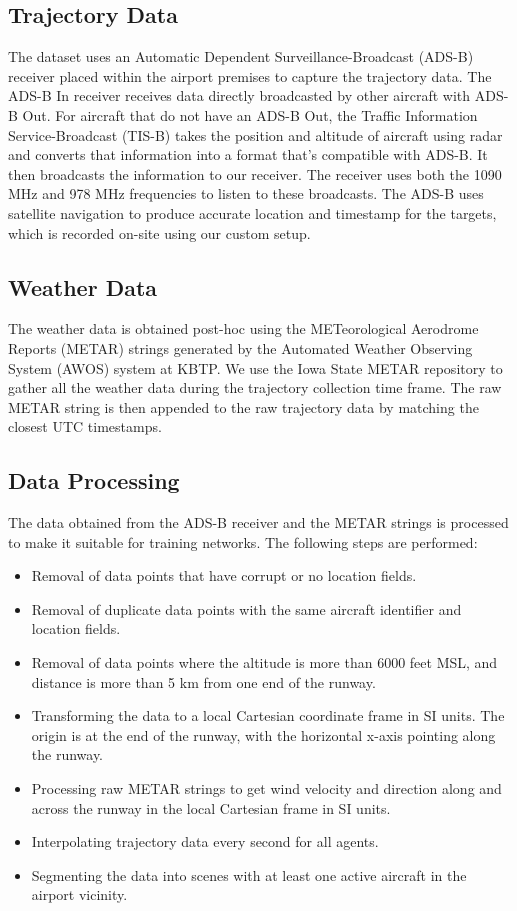 \documentclass[letterpaper, 10 pt, conference]{ieeeconf}
\begin{document}
\subsection{Trajectory Data}
The dataset uses an Automatic Dependent Surveillance-Broadcast (ADS-B) receiver \cite{dewsbury-2019} placed within the airport premises to capture the trajectory data. The ADS-B In receiver receives data directly broadcasted by other aircraft with ADS-B Out. For aircraft that do not have an ADS-B Out, the Traffic Information Service-Broadcast (TIS-B) takes the position and altitude of aircraft using radar and converts that information into a format that’s compatible with ADS-B. It then broadcasts the information to our receiver. The receiver uses both the 1090 MHz and 978 MHz frequencies to listen to these broadcasts. The ADS-B uses satellite navigation to produce accurate location and timestamp for the targets, which is recorded on-site using our custom setup.

\subsection{Weather Data}
The weather data is obtained post-hoc using the METeorological Aerodrome Reports (METAR) strings generated by the Automated Weather Observing System (AWOS) system at KBTP. We use the Iowa State METAR repository \cite{herzmann2004iowa} to gather all the weather data during the trajectory collection time frame. The raw METAR string is then appended to the raw trajectory data by matching the closest UTC timestamps.

\subsection{Data Processing}
The data obtained from the ADS-B receiver and the METAR strings is processed to make it suitable for training networks. The following steps are performed:
\begin{itemize}
    \item Removal of data points that have corrupt or no location fields.
    \item Removal of duplicate data points with the same aircraft identifier and location fields.
    \item Removal of data points where the altitude is more than 6000 feet MSL, and distance is more than 5 km from one end of the runway.
    \item Transforming the data to a local Cartesian coordinate frame in SI units. The origin is at the end of the runway, with the horizontal x-axis pointing along the runway.
    \item Processing raw METAR strings to get wind velocity and direction along and across the runway in the local Cartesian frame in SI units.
    \item Interpolating trajectory data every second for all agents.
    \item Segmenting the data into scenes with at least one active aircraft in the airport vicinity.   
    
\end{itemize}
\end{document}
